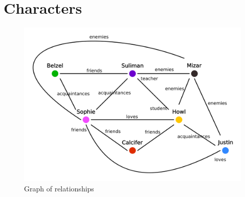 \chapter{Characters}

  
  
  
  
  
  
  
  
  \begin{figure}
    \includegraphics[scale=0.35]{images/relationships}
    \caption{Graph of relationships}
  \end{figure}
